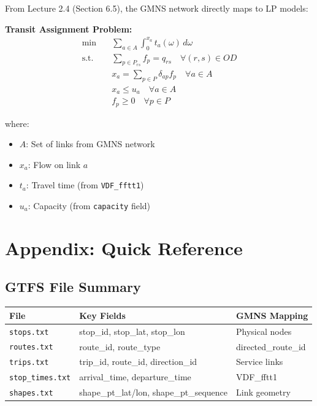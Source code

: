 \documentclass[11pt,letterpaper]{article}
\begin{document}
From Lecture 2.4 (Section 6.5), the GMNS network directly maps to LP models:

\textbf{Transit Assignment Problem:}
\begin{align}
\min \quad & \sum_{a \in A} \int_0^{x_a} t_a(\omega) \, d\omega \\
\text{s.t.} \quad & \sum_{p \in P_{rs}} f_p = q_{rs} \quad \forall (r,s) \in OD \\
& x_a = \sum_{p \in P} \delta_{ap} f_p \quad \forall a \in A \\
& x_a \leq u_a \quad \forall a \in A \\
& f_p \geq 0 \quad \forall p \in P
\end{align}

where:
\begin{itemize}[nosep]
    \item $A$: Set of links from GMNS network
    \item $x_a$: Flow on link $a$
    \item $t_a$: Travel time (from \texttt{VDF\_fftt1})
    \item $u_a$: Capacity (from \texttt{capacity} field)
\end{itemize}

\section{Appendix: Quick Reference}

\subsection{GTFS File Summary}

\begin{center}
\begin{tabular}{lll}
\toprule
\textbf{File} & \textbf{Key Fields} & \textbf{GMNS Mapping} \\
\midrule
\texttt{stops.txt} & stop\_id, stop\_lat, stop\_lon & Physical nodes \\
\texttt{routes.txt} & route\_id, route\_type & directed\_route\_id \\
\texttt{trips.txt} & trip\_id, route\_id, direction\_id & Service links \\
\texttt{stop\_times.txt} & arrival\_time, departure\_time & VDF\_fftt1 \\
\texttt{shapes.txt} & shape\_pt\_lat/lon, shape\_pt\_sequence & Link geometry \\
\bottomrule
\end{tabular}
\end{center}
\end{document}

